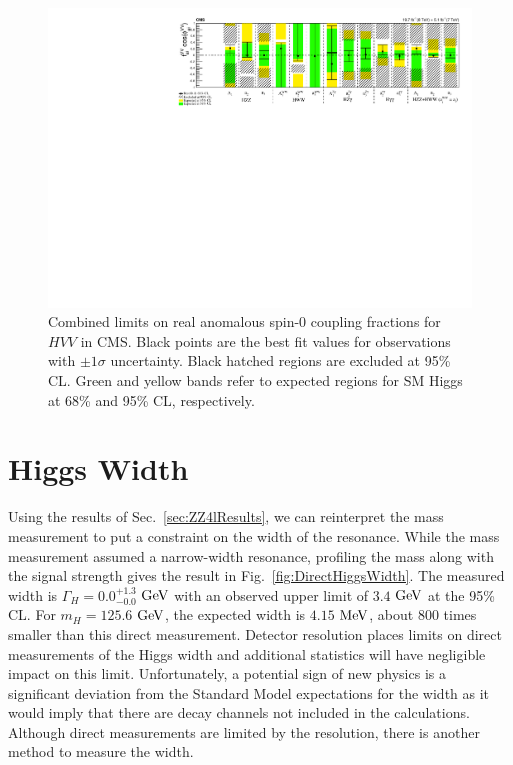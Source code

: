 \begin{figure}[htbp]
\begin{center}
\includegraphics[width=.9\linewidth]{HiggsProperties/figures/Summary_spin0.pdf}
\caption[Summary of Allowed Intervals for Anomalous Spin-0 $HVV$ Couplings for $125.6$ $\rm{GeV}$ Higgs Boson]{Combined limits on real anomalous spin-0 coupling fractions for $HVV$ in CMS. Black points are the best fit values for observations with $\pm1\sigma$ uncertainty. Black hatched regions are excluded at 95\% CL. Green and yellow bands refer to expected regions for SM Higgs at 68\% and 95\% CL, respectively.}
\label{fig:Spin0Exclusions_Combined}
\end{center}
\end{figure}

\section{Higgs Width}
\label{sec:Width}

Using the results of Sec.~\ref{sec:ZZ4lResults}, we can reinterpret the mass measurement to put a constraint on the width of the resonance. While the mass measurement assumed a narrow-width resonance, profiling the mass along with the signal strength gives the result in Fig.~\ref{fig:DirectHiggsWidth}. The measured width is $\Gamma_{H} = 0.0^{+1.3}_{-0.0}$ $\rm{GeV}$ with an observed upper limit of $3.4$ $\rm{GeV}$ at the 95\% CL. For $m_H = 125.6$ $\rm{GeV}$, the expected width is $4.15$ $\rm{MeV}$, about 800 times smaller than this direct measurement. Detector resolution places limits on direct measurements of the Higgs width and additional statistics will have negligible impact on this limit. Unfortunately, a potential sign of new physics is a significant deviation from the Standard Model expectations for the width as it would imply that there are decay channels not included in the calculations. Although direct measurements are limited by the resolution, there is another method to measure the width.


